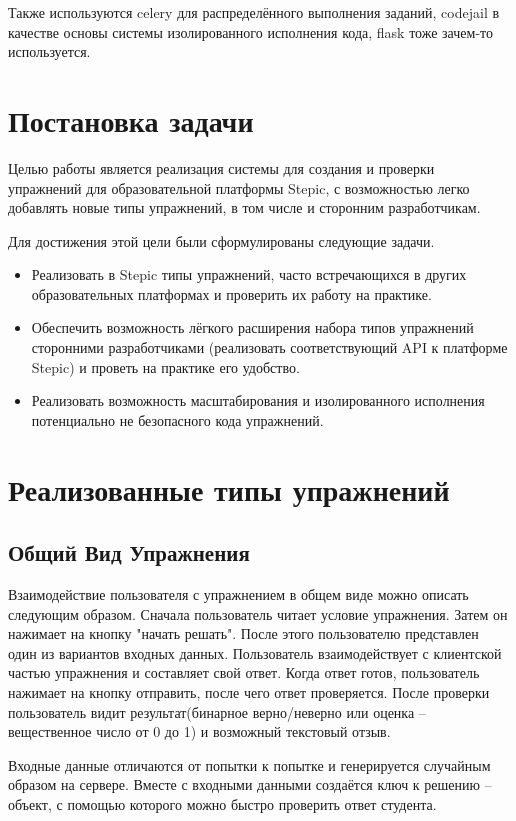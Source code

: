 \documentclass{matmex-diploma-custom}
\begin{document}
Также используются celery для распределённого выполнения заданий,
codejail в качестве основы системы изолированного исполнения кода,
flask тоже зачем-то используется.

\section{Постановка задачи}
Целью работы является реализация системы для создания и проверки
упражнений для образовательной платформы Stepic, с возможностью легко
добавлять новые типы упражнений, в том числе и сторонним
разработчикам.

Для достижения этой цели были сформулированы следующие задачи.

\begin{itemize}
\item Реализовать в Stepic типы упражнений, часто встречающихся в
  других образовательных платформах и проверить их работу на практике.
\item Обеспечить возможность лёгкого расширения набора типов
  упражнений сторонними разработчиками (реализовать соответствующий API
  к платформе Stepic) и проветь на практике его удобство.
\item Реализовать возможность масштабирования и изолированного
  исполнения потенциально не безопасного кода упражнений.
\end{itemize}

\section{Реализованные типы упражнений}

\subsection*{Общий Вид Упражнения}
Взаимодействие пользователя с упражнением в общем виде можно
описать следующим образом.  Сначала пользователь читает условие
упражнения. Затем он нажимает на кнопку "начать решать". После
этого пользователю представлен один из вариантов
входных данных. Пользователь взаимодействует с клиентской частью
упражнения и составляет свой ответ. Когда ответ готов, пользователь
нажимает на кнопку отправить, после чего ответ проверяется. После
проверки пользователь видит результат(бинарное верно/неверно или
оценка -- вещественное число от 0 до 1) и возможный текстовый отзыв.

Входные данные отличаются от попытки к попытке и генерируется
случайным образом на сервере. Вместе с входными данными создаётся ключ
к решению -- объект, с помощью которого можно быстро проверить ответ
студента.
\end{document}
